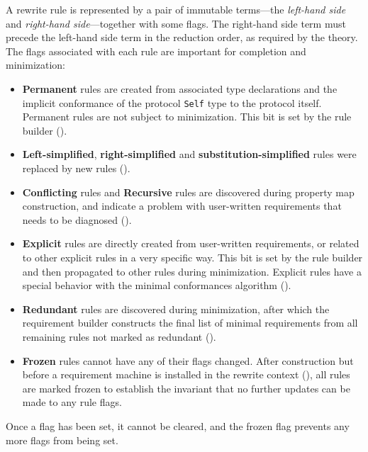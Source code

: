 \documentclass[../generics]{subfiles}
\begin{document}
%
A rewrite rule is represented by a pair of immutable terms---the \emph{left-hand side} and \emph{right-hand side}---together with some flags. The right-hand side term must precede the left-hand side term in the reduction order, as required by the theory. The flags associated with each rule are important for completion and minimization:
\begin{itemize}
%
\item \textbf{Permanent} rules are created from associated type declarations and the implicit conformance of the protocol \texttt{Self} type to the protocol itself. Permanent rules are not subject to minimization. This bit is set by the rule builder ().
%
%
%
\item \textbf{Left-simplified}, \textbf{right-simplified} and \textbf{substitution-simplified} rules were replaced by new rules ().
%
%
\item \textbf{Conflicting} rules and \textbf{Recursive} rules are discovered during property map construction, and indicate a problem with user-written requirements that needs to be diagnosed ().
%
\item \textbf{Explicit} rules are directly created from user-written requirements, or related to other explicit rules in a very specific way. This bit is set by the rule builder and then propagated to other rules during minimization. Explicit rules have a special behavior with the minimal conformances algorithm ().
%
\item \textbf{Redundant} rules are discovered during minimization, after which the requirement builder constructs the final list of minimal requirements from all remaining rules not marked as redundant ().
%
\item \textbf{Frozen} rules cannot have any of their flags changed. After construction but before a requirement machine is installed in the rewrite context (), all rules are marked frozen to establish the invariant that no further updates can be made to any rule flags.
\end{itemize}
Once a flag has been set, it cannot be cleared, and the frozen flag prevents any more flags from being set.
\end{document}

